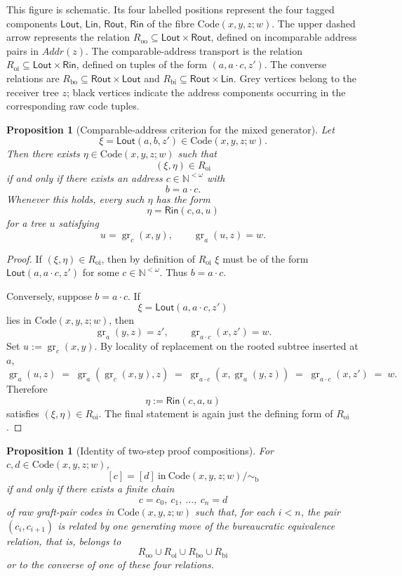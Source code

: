 \documentclass[11pt]{article}
\newtheorem{proposition}[theorem]{Proposition}
\newcommand{\Addr}{\mathit{Addr}}
\newcommand{\graftat}[3]{\operatorname{gr}_{#2}(#3,#1)}
\begin{document}
\noindent\small
This figure is schematic. Its four labelled positions represent the four tagged
components \(\mathsf{Lout}\), \(\mathsf{Lin}\), \(\mathsf{Rout}\),
\(\mathsf{Rin}\) of the fibre \(\mathrm{Code}(x,y,z;w)\). The upper dashed
arrow represents the relation \(R_{\mathrm{oo}}\subseteq
\mathsf{Lout}\times\mathsf{Rout}\), defined on incomparable address pairs in
\(\Addr(z)\). The comparable-address transport is the relation
\(R_{\mathrm{oi}}\subseteq \mathsf{Lout}\times\mathsf{Rin}\), defined on tuples
of the form \((a,a\cdot c,z')\). The converse relations are
\(R_{\mathrm{bo}}\subseteq \mathsf{Rout}\times\mathsf{Lout}\) and
\(R_{\mathrm{bi}}\subseteq \mathsf{Rout}\times\mathsf{Lin}\). Grey vertices
belong to the receiver tree \(z\); black vertices indicate the address
components occurring in the corresponding raw code tuples.

\begin{proposition}[Comparable-address criterion for the mixed generator]
Let
\[
\xi=\mathsf{Lout}(a,b,z')\in \mathrm{Code}(x,y,z;w).
\]
Then there exists \(\eta\in \mathrm{Code}(x,y,z;w)\) such that
\[
(\xi,\eta)\in R_{\mathrm{oi}}
\]
if and only if there exists an address \(c\in \mathbb N^{<\omega}\) with
\[
b=a\cdot c.
\]
Whenever this holds, every such \(\eta\) has the form
\[
\eta=\mathsf{Rin}(c,a,u)
\]
for a tree \(u\) satisfying
\[
u=\graftat{y}{c}{x},
\qquad
\graftat{z}{a}{u}=w.
\]
\end{proposition}

\begin{proof}
If \((\xi,\eta)\in R_{\mathrm{oi}}\), then by definition of \(R_{\mathrm{oi}}\)
\(\xi\) must be of the form \(\mathsf{Lout}(a,a\cdot c,z')\) for some
\(c\in \mathbb N^{<\omega}\). Thus \(b=a\cdot c\).

Conversely, suppose \(b=a\cdot c\). If
\[
\xi=\mathsf{Lout}(a,a\cdot c,z')
\]
lies in \(\mathrm{Code}(x,y,z;w)\), then
\[
\graftat{z}{a}{y}=z',
\qquad
\graftat{z'}{a\cdot c}{x}=w.
\]
Set \(u:=\graftat{y}{c}{x}\). By locality of replacement on the rooted subtree
inserted at \(a\),
\[
\graftat{z}{a}{u}
\;=\;
\graftat{z}{a}{\graftat{y}{c}{x}}
\;=\;
\graftat{\graftat{z}{a}{y}}{a\cdot c}{x}
\;=\;
\graftat{z'}{a\cdot c}{x}
\;=\;
w.
\]
Therefore
\[
\eta:=\mathsf{Rin}(c,a,u)
\]
satisfies \((\xi,\eta)\in R_{\mathrm{oi}}\). The final statement is again just
the defining form of \(R_{\mathrm{oi}}\).
\end{proof}

\begin{proposition}[Identity of two-step proof compositions]
For \(c,d\in \mathrm{Code}(x,y,z;w)\),
\[
[c]=[d]\ \text{in}\ \mathrm{Code}(x,y,z;w)/{\sim_{\mathrm b}}
\]
if and only if there exists a finite chain
\[
c=c_0,\ c_1,\ \dots,\ c_n=d
\]
of raw graft-pair codes in \(\mathrm{Code}(x,y,z;w)\) such that, for each
\(i<n\), the pair \((c_i,c_{i+1})\) is related by one generating move of the
bureaucratic equivalence relation, that is, belongs to
\[
R_{\mathrm{oo}}\cup R_{\mathrm{oi}}\cup R_{\mathrm{bo}}\cup R_{\mathrm{bi}}
\]
or to the converse of one of these four relations.
\end{proposition}
\end{document}
